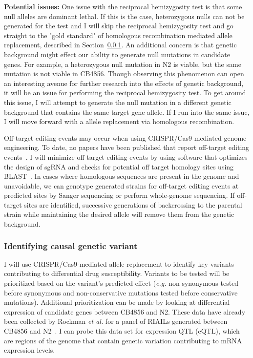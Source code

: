 \documentclass[12pt]{article}
\begin{document}
\vspace{5pt}
{\bf Potential issues: }One issue with the reciprocal hemizygosity test is that some null alleles are dominant lethal. If this is the case, heterozygous nulls can not be generated for the test and I will skip the reciprocal hemizygosity test and go straight to the "gold standard" of homologous recombination mediated allele replacement, described in Section~\ref{Aim22}. An additional concern is that genetic background might effect our ability to generate null mutations in candidate genes. For example, a heterozygous null mutation in N2 is viable, but the same mutation is not viable in CB4856. Though observing this phenomenon can open an interesting avenue for further research into the effects of genetic background, it will be an issue for performing the reciprocal hemizygosity test. To get around this issue, I will attempt to generate the null mutation in a different genetic background that contains the same target gene allele. If I run into the same issue, I will move forward with a allele replacement via homologous recombination. 
\vspace{5pt}

Off-target editing events may occur when using CRISPR/Cas9 mediated genome engineering. To date, no papers have been published that report off-target editing events~\cite{Paix:2014eu}. I will minimize off-target editing events by using software that optimizes the design of sgRNA and checks for potential off target homology sites using BLAST~\cite{Hsu:2013kc}. In cases where homologous sequences are present in the genome and unavoidable, we can genotype generated strains for off-target editing events at predicted sites by Sanger sequencing or perform whole-genome sequencing. If off-target sites are identified, successive generations of backcrossing to the parental strain while maintaining the desired allele will remove them from the genetic background. 
\vspace{-5pt}
\subsubsection{Identifying causal genetic variant}\label{Aim22}

I will use CRISPR/Cas9-mediated allele replacement to identify key variants contributing to differential drug susceptibility. Variants to be tested will be prioritized based on the variant's predicted effect ({\it e.g.} non-synonymous tested before synonymous and non-conservative mutations tested before conservative mutations). Additional prioritization can be made by looking at differential expression of candidate genes between CB4856 and N2. These data have already been collected by Rockman {\it et al.} for a panel of RIAILs generated between CB4856 and N2~\cite{Rockman:2010du}. I can probe this data set for expression QTL (eQTL), which are regions of the genome that contain genetic variation contributing to mRNA expression levels. 
\vspace{5pt}
\end{document}

